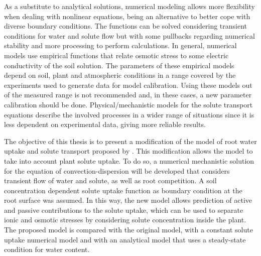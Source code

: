 As a substitute to analytical solutions, numerical modeling allows more flexibility when dealing with nonlinear equations, being an alternative to better cope with diverse boundary conditions. 
The functions can be solved considering transient conditions for water and solute flow but with some pullbacks regarding numerical stability and more processing to perform calculations.
In general, numerical models use empirical functions that relate osmotic stress to some electric conductivity of the soil solution. 
The parameters of these empirical models depend on soil, plant and atmospheric conditions in a range covered by the experiments used to generate data for model calibration. 
Using these models out of the measured range is not recommended and, in these cases, a new parameter calibration should be done.
Physical/mechanistic models for the solute transport equations describe the involved processes in a wider range of situations since it is less dependent on experimental data, giving more reliable results.


The objective of this thesis is to present a modification of the model of root water uptake and solute transport proposed by \citeonline[liersolute].
This modification allows the model to take into account plant solute uptake.
To do so, a numerical mechanistic solution for the equation of convection-dispersion will be developed that considers transient flow of water and solute, as well as root competition.
A soil concentration dependent solute uptake function as boundary condition at the root surface was assumed.
In this way, the new model allows prediction of active and passive contributions to the solute uptake, which can be used to separate ionic and osmotic stresses by considering solute concentration inside the plant. 
The proposed model is compared with the original model, with a constant solute uptake numerical model and with an analytical model that uses a steady-state condition for water content. 
